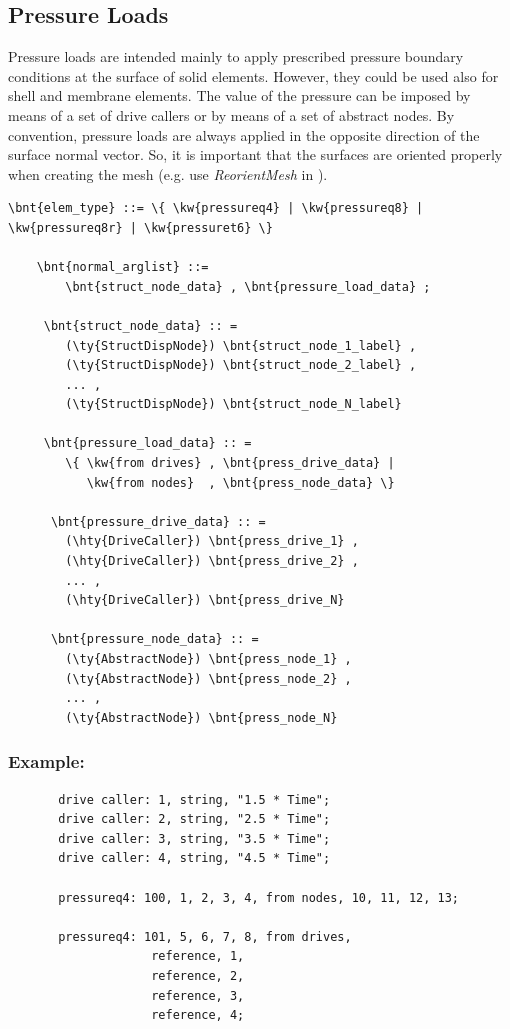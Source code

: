 \subsection{Pressure Loads}
Pressure loads are intended mainly to apply prescribed pressure boundary conditions at the surface of solid elements.
However, they could be used also for shell and membrane elements. The value of the pressure can be imposed
by means of a set of drive callers or by means of a set of abstract nodes. By convention, pressure loads are always applied
in the opposite direction of the surface normal vector. So, it is important that the surfaces are oriented properly
when creating the mesh (e.g. use \emph{ReorientMesh} in ).
\begin{Verbatim}[commandchars=\\\{\}]
  \bnt{elem_type} ::= \{ \kw{pressureq4} | \kw{pressureq8} | \kw{pressureq8r} | \kw{pressuret6} \}

    \bnt{normal_arglist} ::=
        \bnt{struct_node_data} , \bnt{pressure_load_data} ;

     \bnt{struct_node_data} :: =
        (\ty{StructDispNode}) \bnt{struct_node_1_label} ,
        (\ty{StructDispNode}) \bnt{struct_node_2_label} ,
        ... ,
        (\ty{StructDispNode}) \bnt{struct_node_N_label}

     \bnt{pressure_load_data} :: =
        \{ \kw{from drives} , \bnt{press_drive_data} |
           \kw{from nodes}  , \bnt{press_node_data} \}

      \bnt{pressure_drive_data} :: =
        (\hty{DriveCaller}) \bnt{press_drive_1} ,
        (\hty{DriveCaller}) \bnt{press_drive_2} ,
        ... ,
        (\hty{DriveCaller}) \bnt{press_drive_N}

      \bnt{pressure_node_data} :: =
        (\ty{AbstractNode}) \bnt{press_node_1} ,
        (\ty{AbstractNode}) \bnt{press_node_2} ,
        ... ,
        (\ty{AbstractNode}) \bnt{press_node_N}

\end{Verbatim}

\subsubsection{Example:}
\begin{verbatim}
       drive caller: 1, string, "1.5 * Time";
       drive caller: 2, string, "2.5 * Time";
       drive caller: 3, string, "3.5 * Time";
       drive caller: 4, string, "4.5 * Time";

       pressureq4: 100, 1, 2, 3, 4, from nodes, 10, 11, 12, 13;

       pressureq4: 101, 5, 6, 7, 8, from drives,
                    reference, 1,
                    reference, 2,
                    reference, 3,
                    reference, 4;
\end{verbatim}

